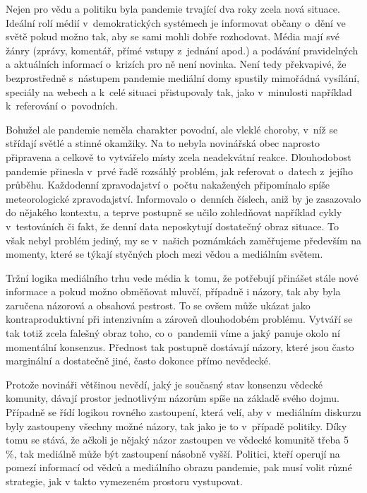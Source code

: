 Nejen pro vědu a politiku byla pandemie trvající dva roky zcela nová situace. Ideální rolí médií v~demokratických systémech je informovat občany o~dění ve světě pokud možno tak, aby se sami mohli dobře rozhodovat. Média mají své žánry (zprávy, komentář, přímé vstupy z~jednání apod.) a podávání pravidelných a aktuálních informací o~krizích pro ně není novinka. Není tedy překvapivé, že bezprostředně s~nástupem pandemie mediální domy spustily mimořádná vysílání, speciály na webech a k~celé situaci přistupovaly tak, jako v~minulosti například k~referování o~povodních.

Bohužel ale pandemie neměla charakter povodní, ale vleklé choroby, v~níž se střídají světlé a stinné okamžiky. Na to nebyla novinářská obec naprosto připravena a celkově to vytvářelo místy zcela neadekvátní reakce. Dlouhodobost pandemie přinesla v~prvé řadě rozsáhlý problém, jak referovat o~datech z~jejího průběhu. Každodenní zpravodajství o~počtu nakažených připomínalo spíše meteorologické zpravodajství. Informovalo o~denních číslech, aniž by je zasazovalo do nějakého kontextu, a teprve postupně se učilo zohledňovat například cykly v~testováních či fakt, že denní data neposkytují dostatečný obraz situace. To však nebyl problém jediný, my se v~našich poznámkách zaměřujeme především na momenty, které se týkají styčných ploch mezi vědou a mediálním světem.

Tržní logika mediálního trhu vede média k~tomu, že potřebují přinášet stále nové informace a pokud možno obměňovat mluvčí, případně i názory, tak aby byla zaručena názorová a obsahová pestrost. To se ovšem může ukázat jako kontraproduktivní při intenzivním a zároveň dlouhodobém problému. Vytváří se tak totiž zcela falešný obraz toho, co o~pandemii víme a jaký panuje okolo ní momentální konsenzus. Přednost tak postupně dostávají názory, které jsou často marginální a dostatečně jiné, často dokonce přímo nevědecké.

Protože novináři většinou nevědí, jaký je současný stav konsenzu vědecké komunity, dávají prostor jednotlivým názorům spíše na základě svého dojmu. Případně se řídí logikou rovného zastoupení, která velí, aby v~mediálním diskurzu byly zastoupeny všechny možné názory, tak jako je to v~případě politiky. Díky tomu se stává, že ačkoli je nějaký názor zastoupen ve vědecké komunitě třeba 5 \%, tak mediálně může být zastoupení násobně vyšší. Politici, kteří operují na pomezí informací od vědců a mediálního obrazu pandemie, pak musí volit různé strategie, jak v takto vymezeném prostoru vystupovat.

